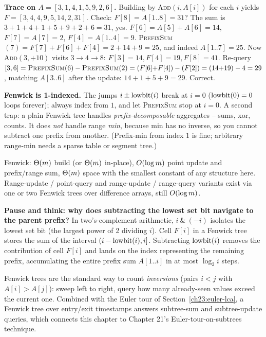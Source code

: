 \begin{labbox}
\textbf{Trace on $A=[3,1,4,1,5,9,2,6]$.} Building by \textsc{Add}$(i,A[i])$ for each $i$
yields $F=[3,4,4,9,5,14,2,31]$. Check: $F[8]=A[1..8]=31$? The sum is
$3{+}1{+}4{+}1{+}5{+}9{+}2{+}6=31$, yes. $F[6]=A[5]{+}A[6]=14$, $F[7]=A[7]=2$,
$F[4]=A[1..4]=9$. \textsc{PrefixSum}$(7)=F[7]+F[6]+F[4]=2+14+9=25$, and indeed $A[1..7]=25$.
Now \textsc{Add}$(3,+10)$ visits $3\to4\to8$: $F[3]{=}14,F[4]{=}19,F[8]{=}41$. Re-query
$[3,6]=\textsc{PrefixSum}(6)-\textsc{PrefixSum}(2)=(F[6]{+}F[4])-(F[2])=(14{+}19)-4=29$,
matching $A[3..6]$ after the update: $14{+}1{+}5{+}9=29$. Correct.
\end{labbox}

\begin{trapbox}
\textbf{Fenwick is 1-indexed.} The jumps $i\pm\operatorname{lowbit}(i)$ break at $i=0$ ($\operatorname{lowbit}(0)=0$
loops forever); always index from $1$, and let \textsc{PrefixSum} stop at $i=0$. A second
trap: a plain Fenwick tree handles \emph{prefix-decomposable} aggregates -- sums, xor,
counts. It does \emph{not} handle range \emph{min}, because min has no inverse, so you cannot
subtract one prefix from another. (Prefix-min from index $1$ is fine; arbitrary range-min
needs a sparse table or segment tree.)
\end{trapbox}

\begin{complexitybox}
Fenwick: $\Theta(m)$ build (or $\Theta(m)$ in-place), $O(\log m)$ point update and prefix/range
sum, $\Theta(m)$ space with the smallest constant of any structure here. Range-update /
point-query and range-update / range-query variants exist via one or two Fenwick trees over
difference arrays, still $O(\log m)$.
\end{complexitybox}

\begin{recoverybox}
\textbf{Pause and think: why does subtracting the lowest set bit navigate to the parent prefix?}
In two's-complement arithmetic, $i \ \&\ (-i)$ isolates the lowest set bit (the largest power of 2 dividing $i$). Cell $F[i]$ in a Fenwick tree stores the sum of the interval $(i - \operatorname{lowbit}(i), i]$. Subtracting $\operatorname{lowbit}(i)$ removes the contribution of cell $F[i]$ and lands on the index representing the remaining prefix, accumulating the entire prefix sum $A[1..i]$ in at most $\log_2 i$ steps.
\end{recoverybox}

\begin{applicationbox}
Fenwick trees are the standard way to count \emph{inversions} (pairs $i<j$ with $A[i]>A[j]$):
sweep left to right, query how many already-seen values exceed the current one. Combined with
the Euler tour of Section~\ref{ch23:euler-lca}, a Fenwick tree over entry/exit timestamps
answers subtree-sum and subtree-update queries, which connects this chapter to
Chapter 21's Euler-tour-on-subtrees technique.
\end{applicationbox}

